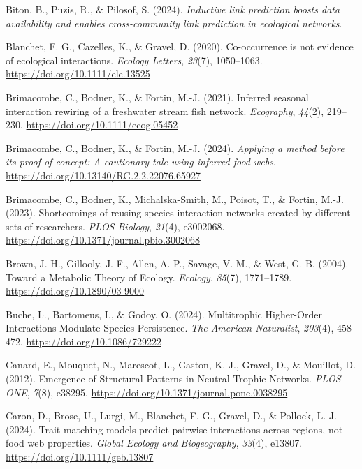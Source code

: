 \documentclass[
]{article}
\newlength{\cslhangindent}
\newenvironment{CSLReferences}[2] %
 {\begin{list}{}{%
  \setlength{\itemindent}{0pt}
  \setlength{\leftmargin}{0pt}
  \setlength{\parsep}{0pt}
  \ifodd #1
   \setlength{\leftmargin}{\cslhangindent}
   \setlength{\itemindent}{-1\cslhangindent}
  \fi
  \setlength{\itemsep}{#2\baselineskip}}}
 {\end{list}}
\begin{document}
\begin{CSLReferences}{1}{0}
Biton, B., Puzis, R., \& Pilosof, S. (2024). \emph{Inductive link
prediction boosts data availability and enables cross-community link
prediction in ecological networks}.

Blanchet, F. G., Cazelles, K., \& Gravel, D. (2020). Co-occurrence is
not evidence of ecological interactions. \emph{Ecology Letters},
\emph{23}(7), 1050--1063. \url{https://doi.org/10.1111/ele.13525}

Brimacombe, C., Bodner, K., \& Fortin, M.-J. (2021). Inferred seasonal
interaction rewiring of a freshwater stream fish network.
\emph{Ecography}, \emph{44}(2), 219--230.
\url{https://doi.org/10.1111/ecog.05452}

Brimacombe, C., Bodner, K., \& Fortin, M.-J. (2024). \emph{Applying a
method before its proof-of-concept: {A} cautionary tale using inferred
food webs}. \url{https://doi.org/10.13140/RG.2.2.22076.65927}

Brimacombe, C., Bodner, K., Michalska-Smith, M., Poisot, T., \& Fortin,
M.-J. (2023). Shortcomings of reusing species interaction networks
created by different sets of researchers. \emph{PLOS Biology},
\emph{21}(4), e3002068.
\url{https://doi.org/10.1371/journal.pbio.3002068}

Brown, J. H., Gillooly, J. F., Allen, A. P., Savage, V. M., \& West, G.
B. (2004). Toward a {Metabolic Theory} of {Ecology}. \emph{Ecology},
\emph{85}(7), 1771--1789. \url{https://doi.org/10.1890/03-9000}

Buche, L., Bartomeus, I., \& Godoy, O. (2024). Multitrophic
{Higher-Order Interactions Modulate Species Persistence}. \emph{The
American Naturalist}, \emph{203}(4), 458--472.
\url{https://doi.org/10.1086/729222}

Canard, E., Mouquet, N., Marescot, L., Gaston, K. J., Gravel, D., \&
Mouillot, D. (2012). Emergence of {Structural Patterns} in {Neutral
Trophic Networks}. \emph{PLOS ONE}, \emph{7}(8), e38295.
\url{https://doi.org/10.1371/journal.pone.0038295}

Caron, D., Brose, U., Lurgi, M., Blanchet, F. G., Gravel, D., \&
Pollock, L. J. (2024). Trait-matching models predict pairwise
interactions across regions, not food web properties. \emph{Global
Ecology and Biogeography}, \emph{33}(4), e13807.
\url{https://doi.org/10.1111/geb.13807}


\end{CSLReferences}
\end{document}

